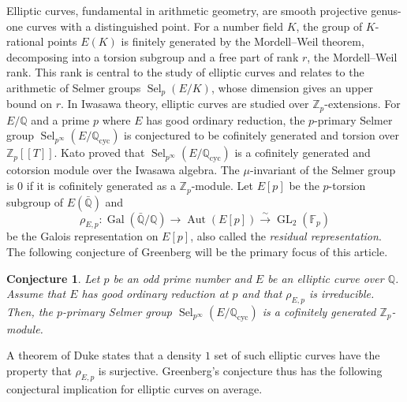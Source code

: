 \documentclass[12pt]{amsart}
\newtheorem{conjecture}[theorem]{Conjecture}
\newcommand{\Z}{\mathbb{Z}}
\newcommand{\Q}{\mathbb{Q}}
\newcommand{\F}{\mathbb{F}}
\newcommand{\op}[1]{\operatorname{#1}}
\numberwithin{equation}{section}
\begin{document}
Elliptic curves, fundamental in arithmetic geometry, are smooth projective genus-one curves with a distinguished point. For a number field \( K \), the group of \( K \)-rational points \( E(K) \) is finitely generated by the Mordell--Weil theorem, decomposing into a torsion subgroup and a free part of rank \( r \), the Mordell--Weil rank. This rank is central to the study of elliptic curves and relates to the arithmetic of Selmer groups \( \operatorname{Sel}_p(E/K) \), whose dimension gives an upper bound on \( r \). In Iwasawa theory, elliptic curves are studied over \( \mathbb{Z}_p \)-extensions. For \( E/\mathbb{Q} \) and a prime \( p \) where \( E \) has good ordinary reduction, the \( p \)-primary Selmer group \( \operatorname{Sel}_{p^\infty}(E/\mathbb{Q}_{\operatorname{cyc}}) \) is conjectured to be cofinitely generated and torsion over \( \mathbb{Z}_p[[T]] \).
Kato \cite{kato} proved that \( \operatorname{Sel}_{p^\infty}(E/\mathbb{Q}_{\operatorname{cyc}}) \) is a cofinitely generated and cotorsion module over the Iwasawa algebra. The $\mu$-invariant of the Selmer group is $0$ if it is cofinitely generated as a $\Z_p$-module. Let $E[p]$ be the $p$-torsion subgroup of $E(\bar{\Q})$ and 
\[\rho_{E, p}: \op{Gal}(\bar{\Q}/\Q)\rightarrow \op{Aut}(E[p])\xrightarrow{\sim} \op{GL}_2(\F_p)\] be the Galois representation on $E[p]$, also called the \emph{residual representation}. The following conjecture of Greenberg will be the primary focus of this article. 
\begin{conjecture}
    Let $p$ be an odd prime number and $E$ be an elliptic curve over $\Q$. Assume that $E$ has good ordinary reduction at $p$ and that $\rho_{E,p}$ is irreducible. Then, the $p$-primary Selmer group $\op{Sel}_{p^\infty}(E/\Q_{\op{cyc}})$ is a cofinitely generated $\Z_p$-module. 
\end{conjecture}
\par A theorem of Duke \cite{Dukeexceptional} states that a density $1$ set of such elliptic curves have the property that $\rho_{E, p}$ is surjective. Greenberg's conjecture thus has the following conjectural implication for elliptic curves on average.
\end{document}
